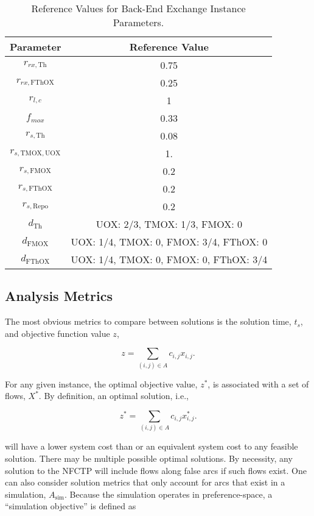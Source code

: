 \begin{table}[h!]
\centering
\caption{Reference Values for Back-End Exchange Instance Parameters.}
\label{tbl:back_ref_params}
\begin{tabular}{|c|c|}
\hline
Parameter    & Reference Value
\\ \hline
$r_{rx, \text{Th}}$   & 0.75 
\\ \hline
$r_{rx, \text{FThOX}}$ & 0.25
\\ \hline
$r_{l, c}$ & 1
\\ \hline
$f_{mox}$     & 0.33
\\ \hline
$r_{s, \text{Th}}$ & 0.08
\\ \hline
$r_{s, \text{TMOX}, \text{UOX}}$ & 1.
\\ \hline
$r_{s, \text{FMOX}}$ & 0.2
\\ \hline
$r_{s, \text{FThOX}}$ & 0.2
\\ \hline
$r_{s, \text{Repo}}$   & 0.2
\\ \hline
$d_{\text{Th}}$   & {UOX: 2/3, TMOX: 1/3, FMOX: 0}
\\ \hline
$d_{\text{FMOX}}$   & {UOX: 1/4, TMOX: 0, FMOX: 3/4, FThOX: 0}
\\ \hline
$d_{\text{FThOX}}$   & {UOX: 1/4, TMOX: 0, FMOX: 0, FThOX: 3/4}
\\ \hline
\end{tabular}
\end{table}

\subsection{Analysis Metrics}

The most obvious metrics to compare between solutions is the solution time,
$t_s$, and objective function value $z$,

\begin{equation}\label{eqn:obj_flow}
z = \sum_{(i, j) \in A} c_{i, j} x_{i, j}.
\end{equation}

\noindent
For any given instance, the optimal objective value, $z^*$, is associated with a
set of flows, $X^*$. By definition, an optimal solution, i.e., 

\begin{equation}\label{eqn:obj_flow}
z^* = \sum_{(i, j) \in A} c_{i, j} x^*_{i, j}.
\end{equation}

\noindent
 will have a lower system cost than or an equivalent system cost to any feasible
 solution. There may be multiple possible optimal solutions. By necessity, any
 solution to the NFCTP will include flows along false arcs if such flows
 exist. One can also consider solution metrics that only account for arcs that
 exist in a simulation, $A_{\text{sim}}$. Because the simulation operates in
 preference-space, a ``simulation objective'' is defined as

